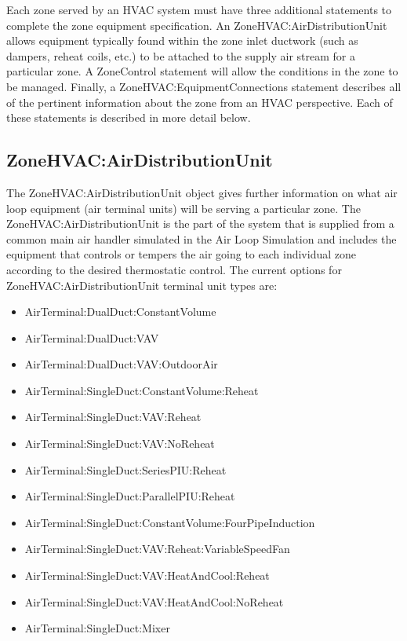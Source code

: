 Each zone served by an HVAC system must have three additional statements to complete the zone equipment specification. An ZoneHVAC:AirDistributionUnit allows equipment typically found within the zone inlet ductwork (such as dampers, reheat coils, etc.) to be attached to the supply air stream for a particular zone. A ZoneControl statement will allow the conditions in the zone to be managed. Finally, a ZoneHVAC:EquipmentConnections statement describes all of the pertinent information about the zone from an HVAC perspective. Each of these statements is described in more detail below.

\subsection{ZoneHVAC:AirDistributionUnit}\label{zonehvacairdistributionunit}

The ZoneHVAC:AirDistributionUnit object gives further information on what air loop equipment (air terminal units) will be serving a particular zone. The ZoneHVAC:AirDistributionUnit is the part of the system that is supplied from a common main air handler simulated in the Air Loop Simulation and includes the equipment that controls or tempers the air going to each individual zone according to the desired thermostatic control. The current options for ZoneHVAC:AirDistributionUnit terminal unit types are:

\begin{itemize}
\item
  AirTerminal:DualDuct:ConstantVolume
\item
  AirTerminal:DualDuct:VAV
\item
  AirTerminal:DualDuct:VAV:OutdoorAir
\item
  AirTerminal:SingleDuct:ConstantVolume:Reheat
\item
  AirTerminal:SingleDuct:VAV:Reheat
\item
  AirTerminal:SingleDuct:VAV:NoReheat
\item
  AirTerminal:SingleDuct:SeriesPIU:Reheat
\item
  AirTerminal:SingleDuct:ParallelPIU:Reheat
\item
  AirTerminal:SingleDuct:ConstantVolume:FourPipeInduction
\item
  AirTerminal:SingleDuct:VAV:Reheat:VariableSpeedFan
\item
  AirTerminal:SingleDuct:VAV:HeatAndCool:Reheat
\item
  AirTerminal:SingleDuct:VAV:HeatAndCool:NoReheat
\item
  AirTerminal:SingleDuct:Mixer
  
\end{itemize}

